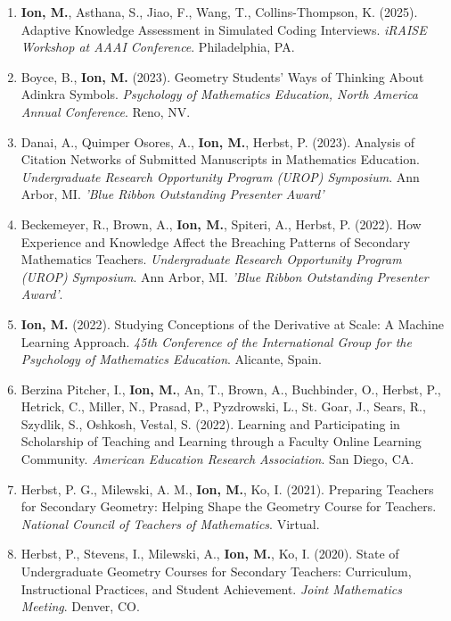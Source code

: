 \documentclass[a4paper,11pt]{article}
\newcommand{\yearsitem}[1]{%
  \item {\reversemarginpar\strut\marginnote{{\small#1}}}%
}
\begin{document}
\begin{enumerate}
\yearsitem{2025}\textbf{Ion, M.}, Asthana, S., Jiao, F., Wang, T., Collins-Thompson, K. (2025). Adaptive Knowledge Assessment in Simulated Coding Interviews. \emph{iRAISE Workshop at AAAI Conference}. Philadelphia, PA.

\yearsitem{2023}Boyce, B., \textbf{Ion, M.} (2023). Geometry Students' Ways of Thinking About Adinkra Symbols. \emph{Psychology of Mathematics Education, North America Annual Conference}. Reno, NV.

\item Danai, A., Quimper Osores, A., \textbf{Ion, M.}, Herbst, P. (2023). Analysis of Citation Networks of Submitted Manuscripts in Mathematics Education. \emph{Undergraduate Research Opportunity Program (UROP) Symposium}. Ann Arbor, MI. \emph{'Blue Ribbon Outstanding Presenter Award'}

\yearsitem{2022}Beckemeyer, R., Brown, A., \textbf{Ion, M.}, Spiteri, A., Herbst, P. (2022). How Experience and Knowledge Affect the Breaching Patterns of Secondary Mathematics Teachers. \emph{Undergraduate Research Opportunity Program (UROP) Symposium}. Ann Arbor, MI. \emph{'Blue Ribbon Outstanding Presenter Award'}.

\item \textbf{Ion, M.} (2022). Studying Conceptions of the Derivative at Scale: A Machine Learning Approach. \emph{45th Conference of the International Group for the Psychology of Mathematics Education}. Alicante, Spain.

\item Berzina Pitcher, I., \textbf{Ion, M.}, An, T., Brown, A., Buchbinder, O., Herbst, P., Hetrick, C., Miller, N., Prasad, P., Pyzdrowski, L., St. Goar, J., Sears, R., Szydlik, S., Oshkosh, Vestal, S. (2022). Learning and Participating in Scholarship of Teaching and Learning through a Faculty Online Learning Community. \emph{American Education Research Association}. San Diego, CA.

\yearsitem{2021}Herbst, P. G., Milewski, A. M., \textbf{Ion, M.}, Ko, I. (2021). Preparing Teachers for Secondary Geometry: Helping Shape the Geometry Course for Teachers. \emph{National Council of Teachers of Mathematics}. Virtual.



\yearsitem{2020}Herbst, P., Stevens, I., Milewski, A., \textbf{Ion, M.}, Ko, I. (2020). State of Undergraduate Geometry Courses for Secondary Teachers: Curriculum, Instructional Practices, and Student Achievement. \emph{Joint Mathematics Meeting}. Denver, CO.


\end{enumerate}
\end{document}

